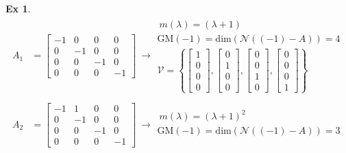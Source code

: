 \documentclass[twoside]{article}
\newtheorem{exmp}[theorem]{Ex}
\begin{document}
\begin{exmp}
\begin{align*}
A_1 &=   \left[ \begin{array}{cccc} -1 & 0 & 0 & 0  \\ 0 & -1 & 0 & 0 \\ 0 & 0 & -1 & 0 \\ 0 & 0 & 0 & -1 \end{array} \right] \ \rightarrow  
\begin{array}{c} \ m(\lambda) = (\lambda + 1) \\ \mathrm{GM}(-1) = \mathrm{dim}\left( \mathcal{N}((-1) - A) \right) = 4 
\\
\mathcal{V} = \left\lbrace  \left[ \begin{array}{c} 1 \\ 0 \\ 0 \\ 0  \end{array} \right] ,   \left[ \begin{array}{c} 0  \\ 1 \\ 0 \\ 0   \end{array} \right] ,   \left[ \begin{array}{c} 0  \\ 0 \\ 1 \\ 0   \end{array} \right] ,   \left[ \begin{array}{c} 0  \\ 0 \\ 0 \\ 1   \end{array} \right] \right\rbrace 
\end{array}
\\
\\
A_2 &=   \left[ \begin{array}{cccc} -1 & 1 & 0 & 0  \\ 0 & -1 & 0 & 0 \\ 0 & 0 & -1 & 0 \\ 0 & 0 & 0 & -1 \end{array} \right] \ \rightarrow  
\begin{array}{c} \ m(\lambda) = (\lambda + 1)^2 \\ \mathrm{GM}(-1) = \mathrm{dim}\left( \mathcal{N}((-1) - A) \right) = 3 
\\

\end{array}
\end{align*}
\end{exmp}
\end{document}
